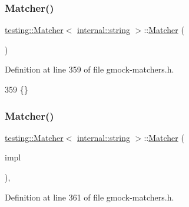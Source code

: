 \subsubsection{\texorpdfstring{Matcher()}{Matcher()}\hspace{0.1cm}{\footnotesize\ttfamily [1/4]}}
{\footnotesize\ttfamily \hyperlink{classtesting_1_1Matcher}{testing\+::\+Matcher}$<$ \hyperlink{namespacetesting_1_1internal_a8e8ff5b11e64078831112677156cb111}{internal\+::string} $>$\+::\hyperlink{classtesting_1_1Matcher}{Matcher} (\begin{DoxyParamCaption}{ }\end{DoxyParamCaption})\hspace{0.3cm}{\ttfamily [inline]}}



Definition at line 359 of file gmock-\/matchers.\+h.


\begin{DoxyCode}
359 \{\}
\end{DoxyCode}
\mbox{\label{classtesting_1_1Matcher_3_01internal_1_1string_01_4_a03a7b1b4a93b762685e2f46d6255d493}} 
\subsubsection{\texorpdfstring{Matcher()}{Matcher()}\hspace{0.1cm}{\footnotesize\ttfamily [2/4]}}
{\footnotesize\ttfamily \hyperlink{classtesting_1_1Matcher}{testing\+::\+Matcher}$<$ \hyperlink{namespacetesting_1_1internal_a8e8ff5b11e64078831112677156cb111}{internal\+::string} $>$\+::\hyperlink{classtesting_1_1Matcher}{Matcher} (\begin{DoxyParamCaption}\item[{const \hyperlink{classtesting_1_1MatcherInterface}{Matcher\+Interface}$<$ \hyperlink{namespacetesting_1_1internal_a8e8ff5b11e64078831112677156cb111}{internal\+::string} $>$ $\ast$}]{impl }\end{DoxyParamCaption})\hspace{0.3cm}{\ttfamily [inline]}, {\ttfamily [explicit]}}



Definition at line 361 of file gmock-\/matchers.\+h.



